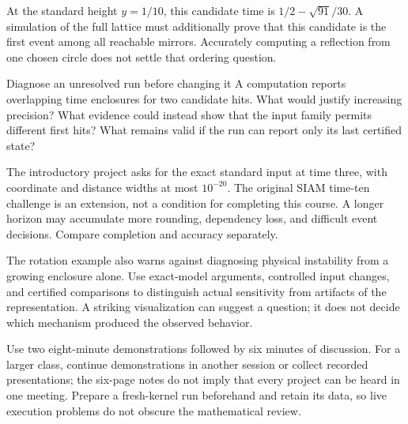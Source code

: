 At the standard height $y=1/10$, this candidate time is
$1/2-\sqrt{91}/30$. A simulation of the full lattice must additionally
prove that this candidate is the first event among all reachable mirrors.
Accurately computing a reflection from one chosen circle does not settle
that ordering question.

\begin{question}{Diagnose an unresolved run before changing it}
A computation reports overlapping time enclosures for two candidate hits.
What would justify increasing precision? What evidence could instead show
that the input family permits different first hits? What remains valid if
the run can report only its last certified state?
\end{question}

The introductory project asks for the exact standard input at time three,
with coordinate and distance widths at most $10^{-20}$. The original SIAM
time-ten challenge is an extension, not a condition for completing this
course. A longer horizon may accumulate more rounding, dependency loss,
and difficult event decisions. Compare completion and accuracy separately.

The rotation example also warns against diagnosing physical instability
from a growing enclosure alone. Use exact-model arguments, controlled input
changes, and certified comparisons to distinguish actual sensitivity from
artifacts of the representation. A striking visualization can suggest a
question; it does not decide which mechanism produced the observed behavior.

\newpage
{}
Use two eight-minute demonstrations followed by six minutes of discussion.
For a larger class, continue demonstrations in another session or collect
recorded presentations; the six-page notes do not imply that every project
can be heard in one meeting. Prepare a fresh-kernel run beforehand and
retain its data, so live execution problems do not obscure the mathematical review.

